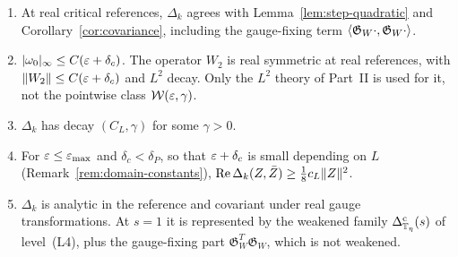 \begin{proposition}\label{prop:hessian-general}
\begin{enumerate}[label=(\alph*)]
\item At real critical references, $\Delta_k$ agrees with Lemma~\ref{lem:step-quadratic} and Corollary~\ref{cor:covariance}, including the gauge-fixing term $\langle \mathfrak G_W\cdot,\mathfrak G_W\cdot\rangle$.
\item $|\omega_0|_\infty\le C(\varepsilon+\delta_c)$. The operator $W_2$ is real symmetric at real references, with $\|W_2\|\le C(\varepsilon+\delta_c)$ and $L^2$ decay. Only the $L^2$ theory of Part~II is used for it, not the pointwise class $\mathcal W(\varepsilon,\gamma)$.
\item $\Delta_k$ has decay $(C_L,\gamma)$ for some $\gamma>0$.
\item For $\varepsilon\le\varepsilon_{\max}$ and $\delta_c<\delta_P$, so that $\varepsilon+\delta_c$ is small depending on $L$ (Remark~\ref{rem:domain-constants}), $\operatorname{Re}\Delta_k(Z,\bar Z)\ge\frac18c_L\|Z\|^2$.
\item $\Delta_k$ is analytic in the reference and covariant under real gauge transformations. At $s=1$ it is represented by the weakened family $\Delta^{\rm c}_{\mathbb T_\eta}(s)$ of level~(L4), plus the gauge-fixing part $\mathfrak G_W^T\mathfrak G_W$, which is not weakened.
\end{enumerate}
\end{proposition}

